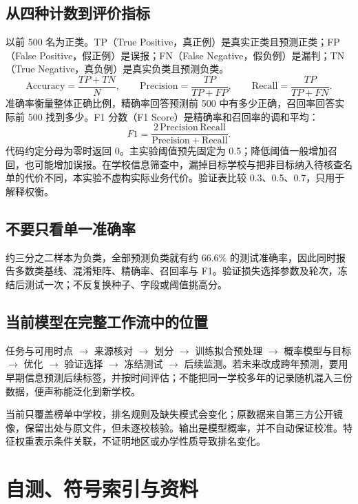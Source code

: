 \documentclass[UTF8,a4paper,11pt,fontset=fandol]{ctexart}
\begin{document}
\subsection{从四种计数到评价指标}
以前 500 名为正类。TP（True Positive，真正例）是真实正类且预测正类；FP（False Positive，假正例）是误报；FN（False Negative，假负例）是漏判；TN（True Negative，真负例）是真实负类且预测负类。
\begin{equation}
\mathrm{Accuracy}=\frac{TP+TN}{N},\qquad
\mathrm{Precision}=\frac{TP}{TP+FP},\qquad
\mathrm{Recall}=\frac{TP}{TP+FN}.
\end{equation}
准确率衡量整体正确比例，精确率回答预测前 500 中有多少正确，召回率回答实际前 500 找到多少。F1 分数（F1 Score）是精确率和召回率的调和平均：
\begin{equation}
F1=\frac{2\,\mathrm{Precision}\,\mathrm{Recall}}{\mathrm{Precision}+\mathrm{Recall}}.
\end{equation}
代码约定分母为零时返回 0。主实验阈值预先固定为 0.5；降低阈值一般增加召回，也可能增加误报。在学校信息筛查中，漏掉目标学校与把非目标纳入待核查名单的代价不同，本实验不虚构实际业务代价。验证表比较 0.3、0.5、0.7，只用于解释权衡。
\subsection{不要只看单一准确率}
约三分之二样本为负类，全部预测负类就有约 66.6\% 的测试准确率，因此同时报告多数类基线、混淆矩阵、精确率、召回率与 F1。验证损失选择参数及轮次，冻结后测试一次；不反复换种子、字段或阈值挑高分。
\subsection{当前模型在完整工作流中的位置}
任务与可用时点 $\to$ 来源核对 $\to$ 划分 $\to$ 训练拟合预处理 $\to$ 概率模型与目标 $\to$ 优化 $\to$ 验证选择 $\to$ 冻结测试 $\to$ 后续监测。若未来改成跨年预测，要用早期信息预测后续标签，并按时间评估；不能把同一学校多年的记录随机混入三份数据，便声称能泛化到新学校。

当前只覆盖榜单中学校，排名规则及缺失模式会变化；原数据来自第三方公开镜像，保留出处与原文件，但未逐校核验。输出是模型概率，并不自动保证校准。特征权重表示条件关联，不证明地区或办学性质导致排名变化。
\clearpage
\section{自测、符号索引与资料}
\end{document}
